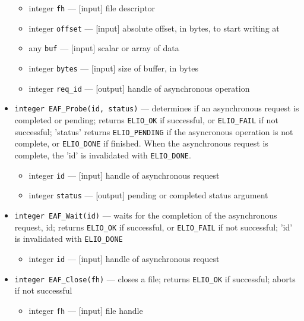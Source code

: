 \begin{itemize}
\begin{itemize}
\item integer {\tt fh} --- [input] file descriptor
\item integer {\tt offset} --- [input] absolute offset, in bytes, to start writing at
\item any     {\tt buf} --- [input] scalar or array of data
\item integer {\tt bytes} --- [input] size of buffer, in bytes
\item integer {\tt req\_id} --- [output] handle of asynchronous operation
\end{itemize}

\item {\tt integer EAF\_Probe(id, status)} --- 
    determines if an asynchronous request is completed or pending;
    returns 
     {\tt ELIO\_OK} if successful, or {\tt ELIO\_FAIL} if not successful;
     'status' returns {\tt ELIO\_PENDING} if the asyncronous operation is
         not complete, or {\tt ELIO\_DONE} if finished.
     When the asynchronous request is complete, the 'id' is invalidated
         with {\tt ELIO\_DONE}.

\begin{itemize}
\item integer {\tt id} --- [input] handle of asynchronous request
\item integer {\tt status} --- [output] pending or completed status argument
\end{itemize}

\item {\tt integer EAF\_Wait(id)} --- 
    waits for the completion of the asynchronous request, id;
  returns
     {\tt ELIO\_OK} if successful, or {\tt ELIO\_FAIL} if not successful;
     'id' is invalidated with {\tt ELIO\_DONE}

\begin{itemize}
\item integer {\tt id} --- [input] handle of asynchronous request
\end{itemize}


\item {\tt integer EAF\_Close(fh)} --- 
    closes a file;
    returns
     {\tt ELIO\_OK} if successful; aborts if not successful
\begin{itemize}
\item integer {\tt fh} --- [input] file handle
\end{itemize}

\end{itemize}


